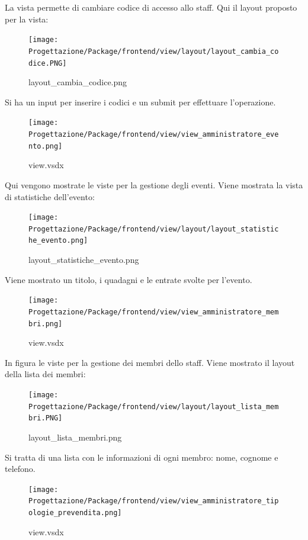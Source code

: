 \documentclass[a4paper]{article}
\begin{document}
La vista permette di cambiare codice di accesso allo staff. Qui il layout proposto per la vista:

\begin{figure}[H]
    \texttt{[image: Progettazione/Package/frontend/view/layout/layout\_cambia\_codice.PNG]}
    \centering
    \caption{layout\_cambia\_codice.png}
\end{figure}

Si ha un input per inserire i codici e un submit per effettuare l'operazione.

\newpage

\begin{figure}[H]
    \texttt{[image: Progettazione/Package/frontend/view/view\_amministratore\_evento.png]}
    \centering
    \caption{view.vsdx}
\end{figure}

Qui vengono mostrate le viste per la gestione degli eventi. Viene mostrata la vista di statistiche dell'evento:

\begin{figure}[H]
    \texttt{[image: Progettazione/Package/frontend/view/layout/layout\_statistiche\_evento.png]}
    \centering
    \caption{layout\_statistiche\_evento.png}
\end{figure}

Viene mostrato un titolo, i quadagni e le entrate svolte per l'evento.

\newpage

\begin{figure}[H]
    \texttt{[image: Progettazione/Package/frontend/view/view\_amministratore\_membri.png]}
    \centering
    \caption{view.vsdx}
\end{figure}

In figura le viste per la gestione dei membri dello staff. Viene mostrato il layout della lista dei membri:

\begin{figure}[H]
    \texttt{[image: Progettazione/Package/frontend/view/layout/layout\_lista\_membri.PNG]}
    \centering
    \caption{layout\_lista\_membri.png}
\end{figure}

Si tratta di una lista con le informazioni di ogni membro: nome, cognome e telefono.

\newpage

\begin{figure}[H]
    \texttt{[image: Progettazione/Package/frontend/view/view\_amministratore\_tipologie\_prevendita.png]}
    \centering
    \caption{view.vsdx}
\end{figure}
\end{document}
